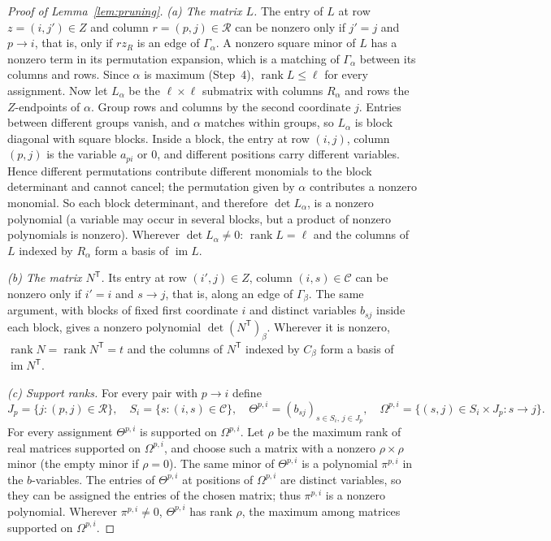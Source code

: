 \documentclass[11pt]{article}
\theoremstyle{remark}
\DeclareMathOperator{\rank}{rank}
\DeclareMathOperator{\im}{im}
\newcommand{\cR}{\mathcal R}
\newcommand{\cC}{\mathcal C}
\newcommand{\tr}{\mathsf T}
\begin{document}
\begin{proof}[Proof of Lemma~\ref{lem:pruning}]
\emph{(a) The matrix $L$.} The entry of $L$ at row $z=(i,j')\in Z$ and column
$r=(p,j)\in\cR$ can be nonzero only if $j'=j$ and $p\to i$, that is, only if
$rz_R$ is an edge of $\Gamma_\alpha$. A nonzero square minor of $L$ has a
nonzero term in its permutation expansion, which is a matching of
$\Gamma_\alpha$ between its columns and rows. Since $\alpha$ is maximum
(Step~4), $\rank L\le\ell$ for every assignment. Now let $L_\alpha$ be the
$\ell\times\ell$ submatrix with columns $R_\alpha$ and rows the $Z$-endpoints
of $\alpha$. Group rows and columns by the second coordinate $j$. Entries
between different groups vanish, and $\alpha$ matches within groups, so
$L_\alpha$ is block diagonal with square blocks. Inside a block, the entry at
row $(i,j)$, column $(p,j)$ is the variable $a_{pi}$ or $0$, and different
positions carry different variables. Hence different permutations contribute
different monomials to the block determinant and cannot cancel; the
permutation given by $\alpha$ contributes a nonzero monomial. So each block
determinant, and therefore $\det L_\alpha$, is a nonzero polynomial (a variable
may occur in several blocks, but a product of nonzero polynomials is nonzero).
Wherever $\det L_\alpha\neq0$: $\rank L=\ell$ and the columns of $L$ indexed by
$R_\alpha$ form a basis of $\im L$.

\emph{(b) The matrix $N^{\tr}$.} Its entry at row $(i',j)\in Z$, column
$(i,s)\in\cC$ can be nonzero only if $i'=i$ and $s\to j$, that is, along an
edge of $\Gamma_\beta$. The same argument, with blocks of fixed first
coordinate $i$ and distinct variables $b_{sj}$ inside each block, gives a
nonzero polynomial $\det(N^{\tr})_\beta$. Wherever it is nonzero,
$\rank N=\rank N^{\tr}=t$ and the columns of $N^{\tr}$ indexed by $C_\beta$
form a basis of $\im N^{\tr}$.

\emph{(c) Support ranks.} For every pair with $p\to i$ define
\[
 J_p=\{j:(p,j)\in\cR\},\quad S_i=\{s:(i,s)\in\cC\},\quad
 \Theta^{p,i}=(b_{sj})_{s\in S_i,\,j\in J_p},\quad
 \Omega^{p,i}=\{(s,j)\in S_i\times J_p:s\to j\}.
\]
For every assignment $\Theta^{p,i}$ is supported on $\Omega^{p,i}$. Let
$\rho$ be the maximum rank of real matrices supported on $\Omega^{p,i}$, and
choose such a matrix with a nonzero $\rho\times\rho$ minor (the empty minor if
$\rho=0$). The same minor of $\Theta^{p,i}$ is a polynomial $\pi^{p,i}$ in the
$b$-variables. The entries of $\Theta^{p,i}$ at positions of $\Omega^{p,i}$ are
distinct variables, so they can be assigned the entries of the chosen matrix;
thus $\pi^{p,i}$ is a nonzero polynomial. Wherever $\pi^{p,i}\ne0$,
$\Theta^{p,i}$ has rank $\rho$, the maximum among matrices supported on
$\Omega^{p,i}$.


\end{proof}
\end{document}
